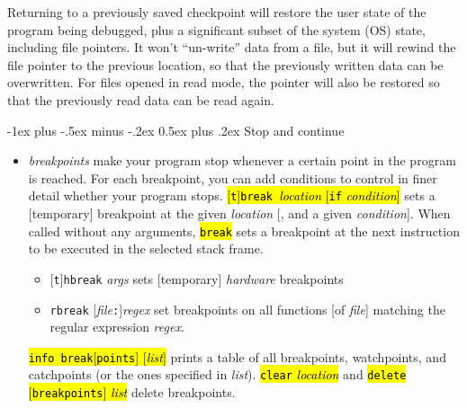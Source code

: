 \documentclass[a4paper,landscape]{article}
\makeatletter
\renewcommand{\section}{\@startsection{section}{1}{0mm}%
                                {-1ex plus -.5ex minus -.2ex}%
                                {0.5ex plus .2ex}%
                                {\normalfont\large\bfseries}}
\makeatother
\begin{document}
\begin{multicols*}{3}
Returning to a previously saved checkpoint will restore the user state of the program
being debugged, plus a significant subset of the system (OS) state, including file pointers. It
won't ``un-write'' data from a file, but it will rewind the file pointer to the previous location,
so that the previously written data can be overwritten. For files opened in read mode, the
pointer will also be restored so that the previously read data can be read again.

\section{Stop and continue}
\begin{itemize}
\item \emph{breakpoints} make your program stop whenever a certain point in the program is reached.  For each breakpoint, you can add conditions to control in finer detail whether your program stops.
\hl{[\texttt{t}]\texttt{break }\textit{location} [\texttt{if} \textit{condition}]} sets a [temporary] breakpoint at the given \textit{location} [, and a given \textit{condition}]. When called without any arguments, \hl{\texttt{break}} sets a breakpoint at the next instruction to be executed in the selected stack frame.
	\begin{itemize}
	\item {}[\texttt{t}]\texttt{hbreak} \textit{args} sets [temporary] \emph{hardware} breakpoints
	\item \texttt{rbreak} [\textit{file}\texttt{:}]\textit{regex} set breakpoints on all functions [of \textit{file}] matching the regular expression \textit{regex}.
	\end{itemize}
\hl{\texttt{info break}[\texttt{points}] [\textit{list}]} prints a table of all breakpoints, watchpoints, and catchpoints (or the ones specified in \textit{list}).
\hl{\texttt{clear} \textit{location}} and \hl{\texttt{delete} [\texttt{breakpoints}] \textit{list}} delete breakpoints.


\end{itemize}
\end{multicols*}
\end{document}
